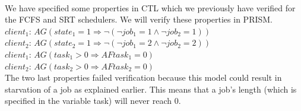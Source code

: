 \documentclass[12pt]{report}
\begin{document}
\\
We have specified some properties in CTL which we previously have verified for the FCFS and SRT schedulers. We will verify these properties in PRISM.\\
$client_1$: $AG (state_1 = 1 \Rightarrow \neg(\neg job_1 = 1 \wedge \neg job_2 = 1))$\\
$client_2$: $AG (state_2 = 1 \Rightarrow \neg(\neg job_1 = 2 \wedge \neg job_2 = 2))$\\
$client_1$: $AG(task_1>0 \Rightarrow AF task_1 = 0)$ \\
$client_2$: $AG(task_2>0 \Rightarrow AF task_2 = 0)$ \\

The two last properties failed verification because this model could result in starvation of a job as explained earlier. This means that a job's length (which is specified in the variable task) will never reach 0.\\
\end{document}
